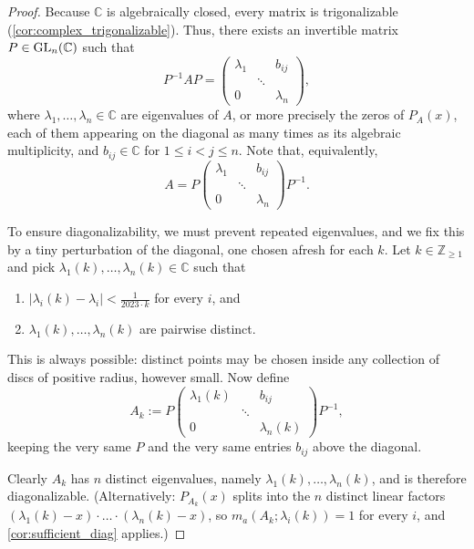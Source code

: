 \begin{proof}
  Because $\mathbb{C}$ is algebraically closed, every matrix is trigonalizable (\cref{cor:complex_trigonalizable}). Thus, there exists an invertible matrix $P \in \operatorname{GL}_n(\mathbb{C})$ such that
  \[ P^{-1} A P = \begin{pmatrix} \lambda_1 & & b_{ij} \\ & \ddots & \\ 0 & & \lambda_n \end{pmatrix}, \]
  where $\lambda_1, \dots, \lambda_n \in \mathbb{C}$ are  eigenvalues of $A$, or more precisely the zeros of $P_A(x)$, each of them appearing on the diagonal as many times as its algebraic multiplicity, and $b_{ij} \in \mathbb{C}$ for $1 \le i < j \le n$. Note that, equivalently,
  \begin{equation} \label{eq:trigonalized_A}
    A = P \begin{pmatrix} \lambda_1 & & b_{ij} \\ & \ddots & \\ 0 & & \lambda_n \end{pmatrix} P^{-1}.
  \end{equation}

  To ensure diagonalizability, we must prevent repeated eigenvalues, and we fix this by a tiny perturbation of the diagonal, one chosen afresh for each $k$. Let $k \in \mathbb{Z}_{\ge 1}$ and pick $\lambda_1(k), \dots, \lambda_n(k) \in \mathbb{C}$ such that
  \begin{enumerate}[label=\textbf{(\alph*)}]
    \item $\left| \lambda_i(k) - \lambda_i \right| < \frac{1}{2023 \cdot k}$ for every $i$, and
    \item $\lambda_1(k), \dots, \lambda_n(k)$ are pairwise distinct.
  \end{enumerate}
  This is always possible: distinct points may be chosen inside any collection of discs of positive radius, however small. Now define
  \[
  A_k := P \begin{pmatrix} \lambda_1(k) & & b_{ij} \\ & \ddots & \\ 0 & & \lambda_n(k) \end{pmatrix} P^{-1},
  \]
  keeping the very same $P$ and the very same entries $b_{ij}$ above the diagonal.

  Clearly $A_k$ has $n$ distinct eigenvalues, namely $\lambda_1(k), \dots, \lambda_n(k)$, and is therefore diagonalizable. (Alternatively: $P_{A_k}(x)$ splits into the $n$ distinct linear factors $(\lambda_1(k) - x) \cdot \dots \cdot (\lambda_n(k) - x)$, so $m_a(A_k; \lambda_i(k)) = 1$ for every $i$, and \cref{cor:sufficient_diag} applies.)


\end{proof}
